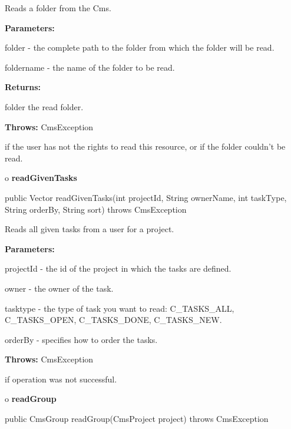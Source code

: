 \begin{description}
\htmlDD Reads a folder from the Cms. 

\begin{description}
\item {\bf Parameters:}  

folder - the complete path to the folder from which the folder will be read.  

foldername - the name of the folder to be read.  
\item {\bf Returns:}  

folder the read folder.  
\item {\bf Throws:} CmsException  

if the user has not the rights to read this resource, or if the folder
couldn't be read.  
\end{description}

\end{description}

o {\bf readGivenTasks} 

\begin{PRE}
 public Vector readGivenTasks(int projectId,
                              String ownerName,
                              int taskType,
                              String orderBy,
                              String sort) throws CmsException
\end{PRE}

\begin{description}
\htmlDD Reads all given tasks from a user for a project. 

\begin{description}
\item {\bf Parameters:}  

projectId - the id of the project in which the tasks are defined.  

owner - the owner of the task.  

tasktype - the type of task you want to read: C\_TASKS\_ALL, C\_TASKS\_OPEN,
C\_TASKS\_DONE, C\_TASKS\_NEW.  

orderBy - specifies how to order the tasks.  
\item {\bf Throws:} CmsException  

if operation was not successful.  
\end{description}

\end{description}

o {\bf readGroup} 

\begin{PRE}
 public CmsGroup readGroup(CmsProject project) throws CmsException
\end{PRE}


